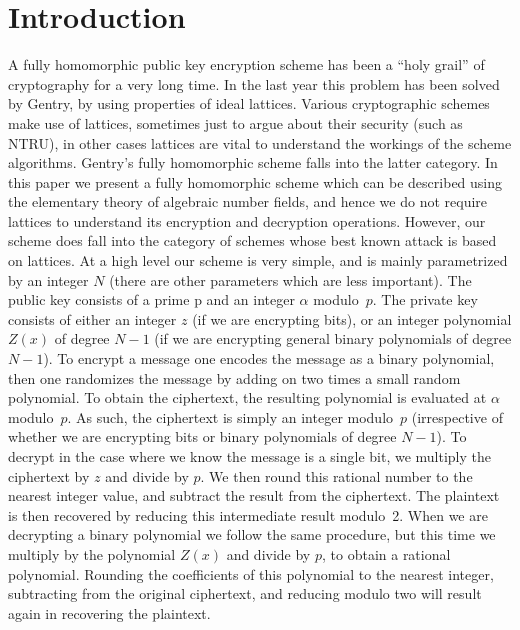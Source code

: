 

\section{Introduction}

A fully homomorphic public key encryption scheme has been a “holy grail” of cryptography for a very long time.
In the last year this problem has been solved by Gentry, by using properties of ideal lattices. 
Various cryptographic schemes make use of lattices, sometimes just to argue about their security (such as NTRU), in other cases lattices are vital to understand the workings of the scheme algorithms. 
Gentry’s fully homomorphic scheme falls into the latter category.
In this paper we present a fully homomorphic scheme which can be described using the elementary theory of algebraic number fields, and hence we do not require lattices to understand its encryption and decryption operations. However, our scheme does fall into the category of schemes whose best known attack is based on lattices.
At a high level our scheme is very simple, and is mainly parametrized by an integer $N$ (there are other parameters which are less important).
The public key consists of a prime p and an integer $\alpha$ modulo~$p$.
The private key consists of either an integer $z$ (if we are encrypting bits), or an integer polynomial $Z(x)$ of degree $N-1$ (if we are encrypting general binary polynomials of degree $N-1$).
To encrypt a message one encodes the message as a binary polynomial, then one randomizes the message by adding on two times a small random polynomial.
To obtain the ciphertext, the resulting polynomial is evaluated at $\alpha$ modulo~$p$.
As such, the ciphertext is simply an integer modulo~$p$ (irrespective of whether we are encrypting bits or binary polynomials of degree $N-1$).
To decrypt in the case where we know the message is a single bit, we multiply the ciphertext by $z$ and divide by $p$. 
We then round this rational number to the nearest integer value, and subtract the result from the ciphertext. 
The plaintext is then recovered by reducing this intermediate result modulo~2. 
When we are decrypting a binary polynomial we follow the same procedure, but this time we multiply by the polynomial $Z(x)$ and divide by $p$, to obtain a rational polynomial. 
Rounding the coefficients of this polynomial to the nearest integer, subtracting from the original ciphertext, and reducing modulo two will result again in recovering the plaintext.

